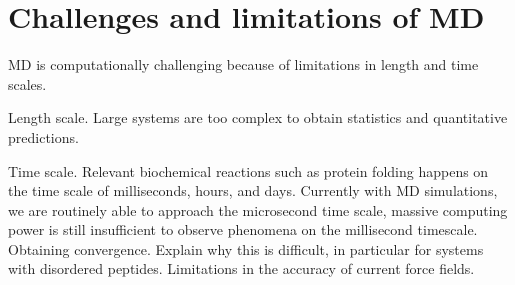 
\section{Challenges and limitations of MD}

\begin{outline}
	\1 MD is computationally challenging because of limitations in length and time scales.
	
		\2 Length scale. Large systems are too complex to obtain statistics and quantitative predictions.
			
		\2 Time scale. Relevant biochemical reactions such as protein folding happens on the time scale of milliseconds, hours, and days. Currently with MD simulations, we are routinely able to approach the microsecond time scale, massive computing power is still insufficient to observe phenomena on the millisecond timescale. %
		\2 Obtaining convergence. Explain why this is difficult, in particular for systems with disordered peptides.
	\1 Limitations in the accuracy of current force fields.
\end{outline}		

